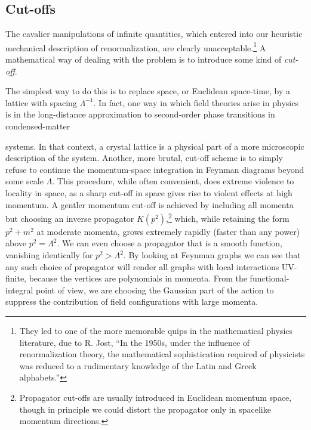 \subsection{Cut-offs}

The cavalier manipulations of infinite quantities, which entered into our
heuristic mechanical description of renormalization, are clearly
unacceptable.\footnote[2]{They led to one of the more memorable quips in the
mathematical physics literature, due to R. Jost, ``In the 1950s, under the
influence of renormalization theory, the mathematical sophistication required
of physicists was reduced to a rudimentary knowledge of the Latin and Greek
alphabets.''} A mathematical way of dealing with the problem is to introduce
some kind of \emph{cut-off}.

The simplest way to do this is to replace space, or Euclidean space-time, by a
lattice with spacing $\Lambda^{-1}$. In fact, one way in which field theories
arise in physics is in the long-distance approximation to second-order phase
transitions in condensed-matter

systems. In that context, a crystal lattice is a physical part of a more
microscopic description of the system. Another, more brutal, cut-off scheme is
to simply refuse to continue the momentum-space integration in Feynman
diagrams beyond some scale $\Lambda$. This procedure, while often convenient,
does extreme violence to locality in space, as a sharp cut-off in space gives
rise to violent effects at high momentum. A gentler momentum cut-off is
achieved by including all momenta but choosing an inverse propagator
$K(p^2)$,\footnote[3]{Propagator cut-offs are usually introduced in Euclidean
momentum space, though in principle we could distort the propagator only in
spacelike momentum directions.} which, while retaining the form $p^2+m^2$ at
moderate momenta, grows extremely rapidly (faster than any power) above
$p^2=\Lambda^2$. We can even choose a propagator that is a smooth function,
vanishing identically for $p^2>\Lambda^2$. By looking at Feynman graphs we
can see that any such choice of propagator will render all graphs with local
interactions UV-finite, because the vertices are polynomials in momenta. From
the functional-integral point of view, we are choosing the Gaussian part of
the action to suppress the contribution of field configurations with large
momenta.

